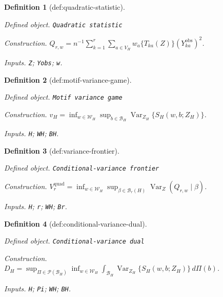 \documentclass{article}
\newtheorem{definition}{Definition}
\begin{document}
\begin{definition}[def:quadratic-statistic]\label{def:quadratic-statistic}
\par\smallskip\noindent\emph{Defined object.} \texttt{Quadratic statistic}
\par\smallskip\noindent\emph{Construction.} \(Q_{r,w}=n^{-1}\sum_{k=1}^r\sum_{a\in V_H}w_a\{T_{ka}(Z)\}(Y^{\mathrm{obs}}_{ka})^2\).
\par\smallskip\noindent\emph{Inputs.} \texttt{Z}; \texttt{Yobs}; \texttt{w}.
\end{definition}

\begin{definition}[def:motif-variance-game]\label{def:motif-variance-game}
\par\smallskip\noindent\emph{Defined object.} \texttt{Motif variance game}
\par\smallskip\noindent\emph{Construction.} \(v_H=\inf_{w\in\mathcal W_H}\sup_{b\in\mathcal B_H}\operatorname{Var}_{Z_H}\{S_H(w,b;Z_H)\}\).
\par\smallskip\noindent\emph{Inputs.} \texttt{H}; \texttt{WH}; \texttt{BH}.
\end{definition}

\begin{definition}[def:variance-frontier]\label{def:variance-frontier}
\par\smallskip\noindent\emph{Defined object.} \texttt{Conditional-\allowbreak{}variance frontier}
\par\smallskip\noindent\emph{Construction.} \(V^{\mathrm{quad}}_r=\inf_{w\in\mathcal W_H}\sup_{\beta\in\mathcal B_r(H)}\operatorname{Var}_Z(Q_{r,w}\mid\beta)\).
\par\smallskip\noindent\emph{Inputs.} \texttt{H}; \texttt{r}; \texttt{WH}; \texttt{Br}.
\end{definition}

\begin{definition}[def:conditional-variance-dual]\label{def:conditional-variance-dual}
\par\smallskip\noindent\emph{Defined object.} \texttt{Conditional-\allowbreak{}variance dual}
\par\smallskip\noindent\emph{Construction.} \(D_H=\sup_{\Pi\in\mathcal P(\mathcal B_H)}\inf_{w\in\mathcal W_H}\int_{\mathcal B_H}\operatorname{Var}_{Z_H}\{S_H(w,b;Z_H)\}\,d\Pi(b)\).
\par\smallskip\noindent\emph{Inputs.} \texttt{H}; \texttt{Pi}; \texttt{WH}; \texttt{BH}.
\end{definition}
\end{document}

